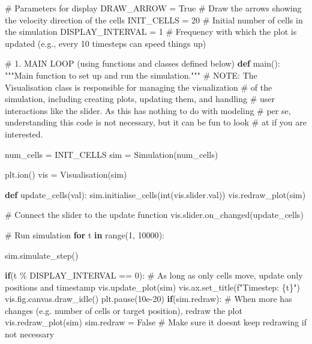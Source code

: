 \documentclass[
  letterpaper,
  DIV=11,
  numbers=noendperiod]{scrreprt}
\newenvironment{Shaded}{\begin{snugshade}}{\end{snugshade}}
\newcommand{\AlertTok}[1]{\textcolor[rgb]{0.68,0.00,0.00}{#1}}
\newcommand{\BuiltInTok}[1]{\textcolor[rgb]{0.00,0.23,0.31}{#1}}
\newcommand{\CommentTok}[1]{\textcolor[rgb]{0.37,0.37,0.37}{#1}}
\newcommand{\ControlFlowTok}[1]{\textcolor[rgb]{0.00,0.23,0.31}{\textbf{#1}}}
\newcommand{\DecValTok}[1]{\textcolor[rgb]{0.68,0.00,0.00}{#1}}
\newcommand{\FloatTok}[1]{\textcolor[rgb]{0.68,0.00,0.00}{#1}}
\newcommand{\KeywordTok}[1]{\textcolor[rgb]{0.00,0.23,0.31}{\textbf{#1}}}
\newcommand{\NormalTok}[1]{\textcolor[rgb]{0.00,0.23,0.31}{#1}}
\newcommand{\OperatorTok}[1]{\textcolor[rgb]{0.37,0.37,0.37}{#1}}
\newcommand{\SpecialCharTok}[1]{\textcolor[rgb]{0.37,0.37,0.37}{#1}}
\newcommand{\SpecialStringTok}[1]{\textcolor[rgb]{0.13,0.47,0.30}{#1}}
\newcommand{\VariableTok}[1]{\textcolor[rgb]{0.07,0.07,0.07}{#1}}
\theoremstyle{definition}
\theoremstyle{remark}
\begin{document}
\begin{tcolorbox}
\begin{Shaded}
\begin{Highlighting}[]
\CommentTok{\# Parameters for display}
\NormalTok{DRAW\_ARROW }\OperatorTok{=} \VariableTok{True}  \CommentTok{\# Draw the arrows showing the velocity direction of the cells}
\NormalTok{INIT\_CELLS }\OperatorTok{=} \DecValTok{20} \CommentTok{\# Initial number of cells in the simulation}
\NormalTok{DISPLAY\_INTERVAL }\OperatorTok{=} \DecValTok{1} \CommentTok{\# Frequency with which the plot is updated (e.g., every 10 timesteps can speed things up)}

\CommentTok{\# 1. MAIN LOOP (using functions and classes defined below)}
\KeywordTok{def}\NormalTok{ main():}
    \CommentTok{"""Main function to set up and run the simulation."""}
    \CommentTok{\# }\AlertTok{NOTE}\CommentTok{: The \textasciigrave{}Visualisation\textasciigrave{} class is responsible for managing the visualization }
    \CommentTok{\# of the simulation, including creating plots, updating them, and handling }
    \CommentTok{\# user interactions like the slider. As this has nothing to do with modeling}
    \CommentTok{\# per se, understanding this code is not necessary, but it can be fun to look}
    \CommentTok{\# at if you are interested. }
    
\NormalTok{    num\_cells }\OperatorTok{=}\NormalTok{ INIT\_CELLS}
\NormalTok{    sim }\OperatorTok{=}\NormalTok{ Simulation(num\_cells) }

\NormalTok{    plt.ion()}
\NormalTok{    vis }\OperatorTok{=}\NormalTok{ Visualisation(sim)}

    \KeywordTok{def}\NormalTok{ update\_cells(val):}
\NormalTok{        sim.initialise\_cells(}\BuiltInTok{int}\NormalTok{(vis.slider.val))}
\NormalTok{        vis.redraw\_plot(sim)}
        
    \CommentTok{\# Connect the slider to the update function}
\NormalTok{    vis.slider.on\_changed(update\_cells)}

    \CommentTok{\# Run simulation}
    \ControlFlowTok{for}\NormalTok{ t }\KeywordTok{in} \BuiltInTok{range}\NormalTok{(}\DecValTok{1}\NormalTok{, }\DecValTok{10000}\NormalTok{):}
        
\NormalTok{        sim.simulate\_step()}
        
        \ControlFlowTok{if}\NormalTok{(t }\OperatorTok{\%}\NormalTok{ DISPLAY\_INTERVAL }\OperatorTok{==} \DecValTok{0}\NormalTok{):}
            \CommentTok{\# As long as only cells move, update only positions and timestamp}
\NormalTok{            vis.update\_plot(sim) }
\NormalTok{            vis.ax.set\_title(}\SpecialStringTok{f"Timestep: }\SpecialCharTok{\{}\NormalTok{t}\SpecialCharTok{\}}\SpecialStringTok{"}\NormalTok{)}
\NormalTok{            vis.fig.canvas.draw\_idle()}
\NormalTok{            plt.pause(}\FloatTok{10e{-}20}\NormalTok{)        }
        \ControlFlowTok{if}\NormalTok{(sim.redraw):}
            \CommentTok{\# When more has changes (e.g. number of cells or target position), redraw the plot}
\NormalTok{            vis.redraw\_plot(sim) }
\NormalTok{            sim.redraw }\OperatorTok{=} \VariableTok{False} \CommentTok{\# Make sure it doesn\textquotesingle{}t keep redrawing if not necessary}
        


\end{Highlighting}
\end{Shaded}
\end{tcolorbox}
\end{document}
